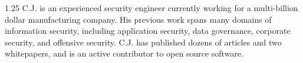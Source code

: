 \documentclass[../main.tex]{subfiles}
\begin{document}
\begin{spacing}{1.25}
C.J. is an experienced security engineer currently working for a multi-billion
dollar manufacturing company. His previous work spans many domains of information
security, including application security, data governance, corporate security,
and offensive security. C.J. has published dozens of articles and two whitepapers,
and is an active contributor to open source software.
\end{spacing}
\vspace{-0.75pt}
\end{document}

